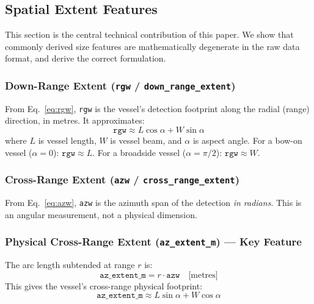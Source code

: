 \documentclass[journal]{IEEEtran}
\begin{document}
\subsection{Spatial Extent Features}
\label{sec:size}

This section is the central technical contribution of this paper. We show that
commonly derived size features are mathematically degenerate in the raw data
format, and derive the correct formulation.

\subsubsection{Down-Range Extent (\texttt{rgw} / \texttt{down\_range\_extent})}

From Eq.~\ref{eq:rgw}, \texttt{rgw} is the vessel's detection footprint along
the radial (range) direction, in metres. It approximates:
\begin{equation}
  \texttt{rgw} \approx L\cos\alpha + W\sin\alpha
\end{equation}
where $L$ is vessel length, $W$ is vessel beam, and $\alpha$ is aspect angle.
For a bow-on vessel ($\alpha=0$): $\texttt{rgw} \approx L$.
For a broadside vessel ($\alpha=\pi/2$): $\texttt{rgw} \approx W$.

\subsubsection{Cross-Range Extent (\texttt{azw} / \texttt{cross\_range\_extent})}

From Eq.~\ref{eq:azw}, \texttt{azw} is the azimuth span of the detection
\emph{in radians}. This is an angular measurement, not a physical dimension.

\subsubsection{Physical Cross-Range Extent (\texttt{az\_extent\_m}) — Key Feature}

The arc length subtended at range $r$ is:
\begin{equation}
  \boxed{\texttt{az\_extent\_m} = r \cdot \texttt{azw} \quad \text{[metres]}}
  \label{eq:az_extent}
\end{equation}
This gives the vessel's cross-range physical footprint:
\begin{equation}
  \texttt{az\_extent\_m} \approx L\sin\alpha + W\cos\alpha
\end{equation}
\end{document}
